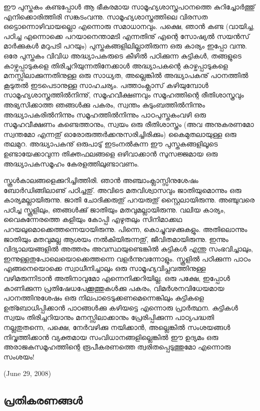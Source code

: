 ഈ പുസ്തകം കണ്ടപ്പോള്‍ ആ ഭീകരമായ സാമൂഹ്യശാസ്ത്രപഠനത്തെ കുറിച്ചോര്‍ത്തു് എനിക്കൊരിത്തിരി സങ്കടംവന്നു. സാമൂഹ്യശാസ്ത്രത്തിലെ വിരസത ഒട്ടൊന്നൊഴിവായല്ലൊ എന്നൊരു സമാധാനവും. പക്ഷെ, ഞാന്‍ കണ്ട (വായിച്ച, പഠിച്ച എന്നൊക്കെ പറയാനെന്താമടി എന്നതിനു് എന്റെ സോഷ്യല്‍ സയന്‍സ് മാര്‍ക്കുകള്‍ മറുപടി പറയും) പുസ്തകങ്ങളിലില്ലാതിരുന്ന ഒരു കാര്യം ഇപ്പോ വന്നു. ഒരേ പുസ്തകം വിവിധ അദ്ധ്യാപകരുടെ കീഴില്‍ പഠിക്കുന്ന കുട്ടികള്‍, തങ്ങളുടെ കാഴ്വപ്പാടുകളെ തിരിച്ചറിയുന്നതിനേക്കാള്‍ അദ്ധ്യാപകന്റെ കാഴ്ചപ്പാടുകളെ മനസ്സിലാക്കുന്നതിനുള്ള ഒരു സാധ്യത, അല്ലെങ്കില്‍ അദ്ധ്യാപകനു് പഠനത്തില്‍ കൂടുതല്‍ ഇടപെടാനുള്ള സാഹചര്യം. പത്താംക്ലാസ് കഴിയുമ്പോള്‍ സാമൂഹ്യശാസ്ത്രത്തില്‍നിന്നു്, സമൂഹവീക്ഷണവും സമൂഹത്തിന്റെ രീതിശാസ്ത്രവും അഭ്യസിക്കാത്ത ഞങ്ങള്‍ക്കു പകരം, സ്വന്തം കുടുംബത്തില്‍നിന്നും അദ്ധ്യാപകരില്‍നിന്നും സമൂഹത്തില്‍നിന്നും പാഠപുസ്തകംവഴി ഒരു സമൂഹവീക്ഷണം കണ്ടെത്താനും, സ്വയം ഒരു രീതിശാസ്ത്രം (അവ അനുകരണമോ സ്വന്തമോ എന്നതു് 
ഓരോരുത്തര്‍ക്കനുസരിച്ചിരിക്കും) കൈമുതലായുള്ള ഒരു തലമുറ. അദ്ധ്യാപകനു് ഒരുപാടു് ഇടംനല്‍കുന്ന ഈ പുസ്തകങ്ങളിലൂടെ ഉണ്ടായേക്കാവുന്ന 
തിക്തഫലങ്ങളെ ഒഴിവാക്കാന്‍ സുസജ്ജമായ ഒരു അദ്ധ്യാപകസമൂഹം കേരളത്തിലുണ്ടാവണം.

സ്കൂള്‍കാലങ്ങളെക്കുറിച്ചിത്തിരി. ഞാന്‍ അഞ്ചാംക്ലാസ്സിനുശേഷം ബോര്‍ഡിങ്ങിലാണു് പഠിച്ചതു്. അവിടെ മതവിശ്വാസവും ജാതിയുമൊന്നും ഒരു കാര്യമല്ലായിരുന്നു. ജാതി ചോദിക്കരുതു് പറയരുതു് സ്റ്റൈലായിരുന്നു. അഞ്ചുവരെ പഠിച്ച സ്കൂളിലും, ഞങ്ങള്‍ക്കു് ജാതിയും മതവുമല്ലായിരുന്നു. വലിയ കാര്യം, വൈകുന്നേരത്തെ കളിയും കോപ്പി എഴുതലും സിനിമാക്കഥ പറയലുമൊക്കെത്തന്നെയായിരുന്നു. പിന്നെ, കൊച്ചുവഴക്കുകളും. അതിലൊന്നും ജാതിയും മതവുമല്ല ആശയം നല്‍കിയിരുന്നതു്, ജീവിതമായിരുന്നു. ഇന്നും വിദ്യാലയങ്ങളില്‍ അത്തരം അവസ്ഥയുണ്ടെങ്കില്‍ കുട്ടികള്‍ എന്തു സംഭവിച്ചാലും, ഇന്നുള്ളതുപോലെയൊക്കെത്തന്നെ വളര്‍ന്നുവന്നോളും. സ്കൂളില്‍ പഠിക്കുന്ന പാഠം എങ്ങനെയൊക്കെ സ്വാധീനിച്ചാലും ഒരു സാമൂഹ്യവിപ്ലവത്തിനുള്ള വഴിമരുന്നിടാന്‍ അതിനാവുമോ എന്നെനിക്കറിയില്ല. ഒരു പക്ഷേ, ഇപ്പോള്‍ കാണിക്കുന്ന 
പ്രതിഷേധപേക്കൂത്തുകള്‍ക്കു പകരം, വിമര്‍ശനവിധേയമായ പഠനത്തിനുശേഷം ഒരു നിലപാടെടുക്കണമെന്നെങ്കിലും കുട്ടികളെ ഉത്ബോധിപ്പിക്കാന്‍ പാഠങ്ങള്‍ക്കു കഴിയട്ടെ എന്നൊരു പ്രാര്‍ത്ഥന. കുട്ടികള്‍ സ്വയം തിരിച്ചറിയാനും മനസ്സിലാക്കാനും പ്രേരിപ്പിക്കുന്ന പാഠ്യപദ്ധതി നല്ലതുതന്നെ, പക്ഷെ, നേര്‍വഴിക്കു നയിക്കാന്‍, അല്ലെങ്കില്‍ സംശയങ്ങള്‍ നിവൃത്തിക്കാന്‍ വ്യക്തമായ സംവിധാനങ്ങളില്ലെങ്കില്‍ ഈ ഉദ്യമം ഒരു അരാജകസമൂഹത്തിന്റെ രൂപീകരണത്തെ ത്വരിതപ്പെടുത്തുമോ എന്നൊരു സംശയം!
\begin{flushright}(June 29, 2008)\end{flushright}

\subsection*{പ്രതികരണങ്ങള്‍}

